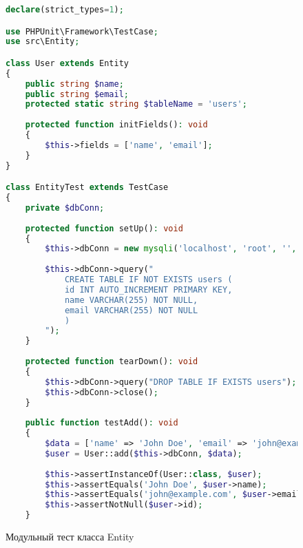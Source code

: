 \begin{figure}[H]
\begin{lstlisting}[language=PHP]
declare(strict_types=1);

use PHPUnit\Framework\TestCase;
use src\Entity;

class User extends Entity
{
	public string $name;
	public string $email;
	protected static string $tableName = 'users';
	
	protected function initFields(): void
	{
		$this->fields = ['name', 'email'];
	}
}

class EntityTest extends TestCase
{
	private $dbConn;
	
	protected function setUp(): void
	{
		$this->dbConn = new mysqli('localhost', 'root', '', 'test_db');
		
		$this->dbConn->query("
			CREATE TABLE IF NOT EXISTS users (
			id INT AUTO_INCREMENT PRIMARY KEY,
			name VARCHAR(255) NOT NULL,
			email VARCHAR(255) NOT NULL
			)
		");
	}
	
	protected function tearDown(): void
	{
		$this->dbConn->query("DROP TABLE IF EXISTS users");
		$this->dbConn->close();
	}
	
	public function testAdd(): void
	{
		$data = ['name' => 'John Doe', 'email' => 'john@example.com'];
		$user = User::add($this->dbConn, $data);
		
		$this->assertInstanceOf(User::class, $user);
		$this->assertEquals('John Doe', $user->name);
		$this->assertEquals('john@example.com', $user->email);
		$this->assertNotNull($user->id);
	}
\end{lstlisting}  
\caption{Модульный тест класса Entity}
\label{unitEntity1:image}
\end{figure}

